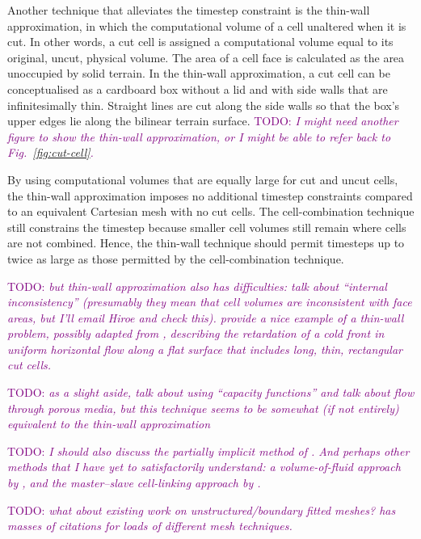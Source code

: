 \documentclass{article}
\newcommand{\TODO}[1]{\textcolor{purple}{TODO: \emph{#1}}}
\begin{document}
Another technique that alleviates the timestep constraint is the thin-wall approximation, in which the computational volume of a cell unaltered when it is cut.  In other words, a cut cell is assigned a computational volume equal to its original, uncut, physical volume.  The area of a cell face is calculated as the area unoccupied by solid terrain.  In the thin-wall approximation, a cut cell can be conceptualised as a cardboard box without a lid and with side walls that are infinitesimally thin.  Straight lines are cut along the side walls so that the box's upper edges lie along the bilinear terrain surface.  \TODO{I might need another figure to show the thin-wall approximation, or I might be able to refer back to Fig.~\ref{fig:cut-cell}.}

By using computational volumes that are equally large for cut and uncut cells, the thin-wall approximation imposes no additional timestep constraints compared to an equivalent Cartesian mesh with no cut cells.  The cell-combination technique still constrains the timestep because smaller cell volumes still remain where cells are not combined.  Hence, the thin-wall technique should permit timesteps up to twice as large as those permitted by the cell-combination technique.

\TODO{but thin-wall approximation also has difficulties: \citet{yamazaki-satomura2010} talk about ``internal inconsistency'' (presumably they mean that cell volumes are inconsistent with face areas, but I'll email Hiroe and check this).  \citet{walko-avissar2008b} provide a nice example of a thin-wall problem, possibly adapted from \citet{calhoun-leveque2000}, describing the retardation of a cold front in uniform horizontal flow along a flat surface that includes long, thin, rectangular cut cells.}

\TODO{as a slight aside, \citet{calhoun-leveque2000} talk about using ``capacity functions'' and talk about flow through porous media, but this technique seems to be somewhat (if not entirely) equivalent to the thin-wall approximation}

\TODO{I should also discuss the partially implicit method of \citet{jebens2011}.  And perhaps other methods that I have yet to satisfactorily understand: a volume-of-fluid approach by \citet{almgren1997}, and the master--slave cell-linking approach by \citet{kirkpatrick2003}.}

\TODO{what about existing work on unstructured/boundary fitted meshes?  \citet{almgren1997} has masses of citations for loads of different mesh techniques.}
\end{document}
